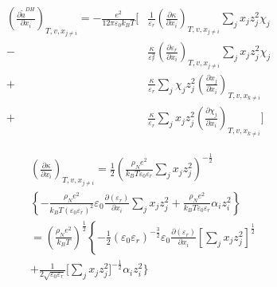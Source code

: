 \documentclass[12pt, letterpaper]{article}
\begin{document}
\begin{equation}
    \begin{aligned}
        \left(\frac{\partial \tilde{a}^{DH}}{\partial x_{i}}\right)_{T,v,x_{j\neq i}}
        =
        -\frac{e^{2}}{12\pi\varepsilon_{0}k_{B}T}
        \Bigg[
          & \frac{1}{\varepsilon_{r}}\left(\frac{\partial\kappa}{\partial x_{i}}\right)_{T,v,x_{j\neq i}}
            \sum_{j}x_{j}z_{j}^{2}\chi_{j}
        \\
        - & \frac{\kappa}{\varepsilon_{r}^{2}}
            \left(\frac{\partial\varepsilon_{r}}{\partial x_{i}}\right)_{T,v,x_{j\neq i}}
            \sum_{j}x_{j}z_{j}^{2}\chi_{j}
        \\
        + & \frac{\kappa}{\varepsilon_{r}}
            \sum_{j}\chi_{j}z_{j}^{2}
            \left(\frac{\partial x_{j}}{\partial x_{i}}\right)_{T,v,x_{k\neq i}}
        \\
        + & \frac{\kappa}{\varepsilon_{r}}
            \sum_{j}x_{j}z_{j}^{2}
            \left(\frac{\partial\chi_{j}}{\partial x_{i}}\right)_{T,v,x_{k\neq i}}
            \Bigg]
    \end{aligned}
    \label{eq:dares_dh_dxi}
\end{equation}


\begin{equation}
    \begin{aligned}
         & \left(\frac{\partial\kappa}{\partial x_{i}}\right)_{T,v,x_{j\neq i}}=\frac12\left(\frac{\rho_{N}e^{2}}{k_{B}T\varepsilon_{0}\varepsilon_{r}}\sum_{j}x_{j}z_{j}^{2}\right)^{-\frac12} \\&\left\{-\frac{\rho_{N}e^2}{k_{B}T\left(\varepsilon_{0}\varepsilon_{r}\right)^2}\varepsilon_{0}\frac{\partial\left(\varepsilon_{r}\right)}{\partial x_{i}}\sum_{j}x_{j}z_{j}^2+\frac{\rho_{N}e^2}{k_{B}T\varepsilon_{0}\varepsilon_{r}}\alpha_{i}z_{i}^2\right\}\\&=\left(\frac{\rho_{N}e^{2}}{k_{B}T}\right)^{\frac{1}{2}}\left\{-\frac{1}{2}\left(\varepsilon_{0}\varepsilon_{r}\right)^{-\frac{3}{2}}\varepsilon_{0}\frac{\partial\left(\varepsilon_{r}\right)}{\partial x_{i}}\left[\sum_{j}x_{j}z_{j}^{2}\right]^{\frac{1}{2}}\right.\\&+\frac{1}{2\sqrt{\varepsilon_{0}\varepsilon_{r}}}\Bigg[\sum_{j}x_{j}z_{j}^2\Bigg]^{-\frac{1}{2}}\alpha_{i}z_{i}^2\Bigg\}
    \end{aligned}
    \label{eq:dkappa_dh_dxi}
\end{equation}
\end{document}
